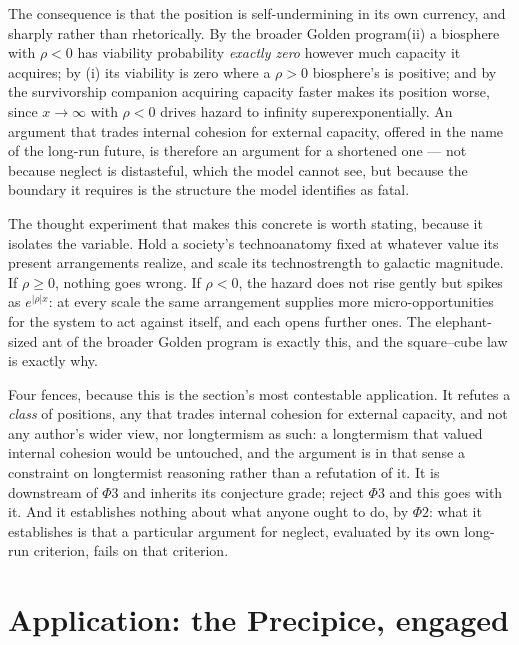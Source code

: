 \documentclass[11pt]{article}
\theoremstyle{plain}
\theoremstyle{definition}
\theoremstyle{remark}
\begin{document}
The consequence is that the position is self-undermining in its own
currency, and sharply rather than rhetorically. By
the broader Golden program(ii) a biosphere with $\rho<0$ has
viability probability \emph{exactly zero} however much capacity it
acquires; by (i) its viability is zero where a $\rho>0$ biosphere's is
positive; and by
the survivorship companion \cite{SurvA} acquiring capacity faster makes its
position worse, since $x\to\infty$ with $\rho<0$ drives hazard to
infinity superexponentially. An argument that trades internal cohesion
for external capacity, offered in the name of the long-run future, is
therefore an argument for a shortened one --- not because neglect is
distasteful, which the model cannot see, but because the boundary it
requires is the structure the model identifies as fatal.

The thought experiment that makes this concrete is worth stating,
because it isolates the variable. Hold a society's technoanatomy fixed
at whatever value its present arrangements realize, and scale its
technostrength to galactic magnitude. If $\rho\ge0$, nothing goes
wrong. If $\rho<0$, the hazard does not rise gently but spikes as
$e^{|\rho|x}$: at every scale the same arrangement supplies more
micro-opportunities for the system to act against itself, and each
opens further ones. The elephant-sized ant of
the broader Golden program is exactly this, and the square--cube
law is exactly why.

Four fences, because this is the section's most contestable
application. It refutes a \emph{class} of positions, any that trades
internal cohesion for external capacity, and not any author's wider
view, nor longtermism as such: a longtermism that valued internal
cohesion would be untouched, and the argument is in that sense a
constraint on longtermist reasoning rather than a refutation of it. It is downstream of $\Phi3$ and inherits its conjecture grade;
reject $\Phi3$ and this goes with it. And it establishes nothing about
what anyone ought to do, by $\Phi2$: what it establishes is that a
particular argument for neglect, evaluated by its own long-run
criterion, fails on that criterion.


\section{Application: the Precipice, engaged}\label{sec:precipice}

\label{gc:subsub:precipice}
\end{document}
